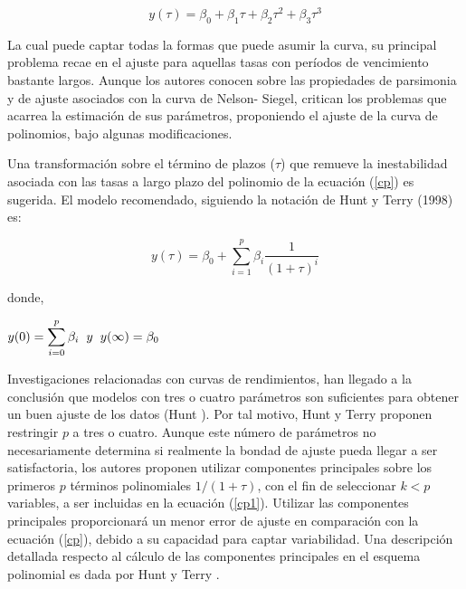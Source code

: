 \begin{equation}
y(\tau) = \beta_{0} + \beta_{1}\tau +\beta_{2}\tau^2 +\beta_{3}\tau^3
\label{cp}
\end{equation}


\hspace*{0.4 cm} La cual puede captar todas la formas que puede asumir la curva, su
principal problema recae en el ajuste para aquellas tasas con per\'iodos de
vencimiento bastante largos. Aunque los autores conocen sobre las
propiedades de parsimonia y de ajuste asociados con la curva de Nelson-
Siegel, critican los problemas que acarrea la estimaci\'on de sus
par\'ametros, proponiendo el ajuste de la curva de polinomios, bajo
algunas modificaciones.

\hspace*{0.4 cm} Una transformaci\'on sobre el t\'ermino de plazos ($\tau$) que remueve la
inestabilidad asociada con las tasas a largo plazo del polinomio de la ecuaci\'on (\ref{cp}) es
sugerida. El modelo recomendado, siguiendo la notaci\'on de Hunt y
Terry (1998) es:

\begin{equation}
y(\tau) = \beta_{0} + \sum_{i=1}^{p} \beta_{i} \frac{1}{(1+\tau)^i}
\label{cp1}
\end{equation} 

\noindent donde,

\begin{center}
$\displaystyle{y(0) = \sum_{i=0}^{p}\beta_{i} \hspace*{0.2 cm} y \hspace*{0.2 cm} y(\infty) = \beta_{0}   }$
\end{center} 

\vspace*{0.2 cm}

\hspace*{0.4 cm}Investigaciones relacionadas con curvas de rendimientos, han llegado a
la conclusi\'on que modelos con tres o cuatro par\'ametros son suficientes
para obtener un buen ajuste de los datos (Hunt \cite{H}). Por tal motivo,
Hunt y Terry \cite{HT} proponen restringir $p$ a tres o cuatro. Aunque este
n\'umero de par\'ametros no necesariamente determina si realmente la
bondad de ajuste pueda llegar a ser satisfactoria, los autores proponen
utilizar componentes principales sobre los primeros $p$ t\'erminos
polinomiales $1/(1 + \tau)$, con el fin de seleccionar $k<p$ variables, a ser
incluidas en la ecuaci\'on (\ref{cp1}). Utilizar las componentes principales
proporcionar\'a un menor error de ajuste en comparaci\'on con la ecuaci\'on (\ref{cp}),
debido a su capacidad para captar variabilidad. Una descripci\'on
detallada respecto al c\'alculo de las componentes principales en el
esquema polinomial es dada por Hunt y Terry \cite{HT}.

